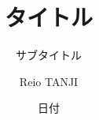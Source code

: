 \documentclass[dvipdfmx,12pt]{beamer}
\title{タイトル}
\subtitle{サブタイトル}
\author{Reio TANJI}
\date{日付}
\institute{Osaka University}
\begin{document}
\begin{frame}\frametitle{}
\titlepage
\end{frame}
\end{document}
